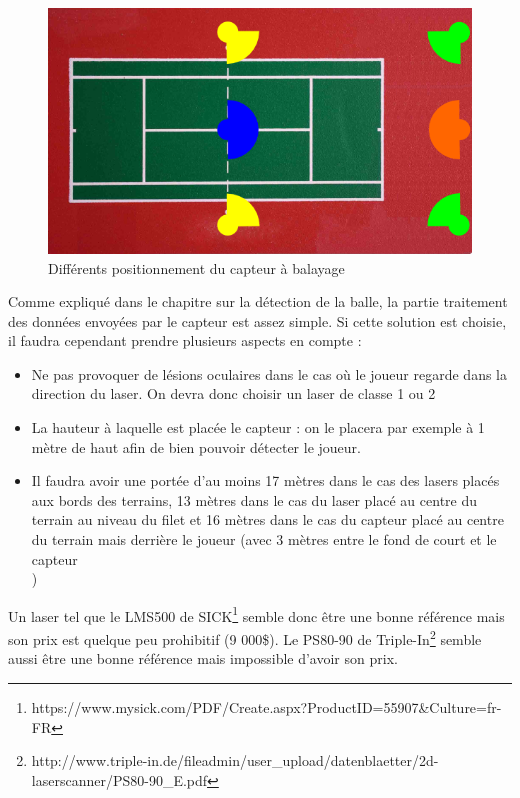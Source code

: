 \begin{figure}[h]
\begin{center}
\includegraphics[width=\textwidth]{joueurpositionlaser.png}
\caption{Différents positionnement du capteur à balayage}
\label{img_joueurpositionlaser}
\end{center}
\end{figure}

Comme expliqué dans le chapitre sur la détection de la balle, la partie traitement des données envoyées par le capteur est assez simple. Si cette solution est choisie, il faudra cependant prendre plusieurs aspects en compte : 

\begin{itemize}
\item Ne pas provoquer de lésions oculaires dans le cas où le joueur regarde dans la direction du laser. On devra donc choisir un laser de classe 1 ou 2
\item La hauteur à laquelle est placée le capteur : on le placera par exemple à 1 mètre de haut afin de bien pouvoir détecter le joueur. 
\item Il faudra avoir une portée d'au moins 17 mètres dans le cas des lasers placés aux bords des terrains, 13 mètres dans le cas du laser placé au centre du terrain au niveau du filet et 16 mètres dans le cas du capteur placé au centre du terrain mais derrière le joueur (avec 3 mètres entre le fond de court et le capteur\\)
\end{itemize}

Un laser tel que le LMS500 de SICK\footnote{https://www.mysick.com/PDF/Create.aspx?ProductID=55907\&Culture=fr-FR} semble donc être une bonne référence mais son prix est quelque peu prohibitif (9 000\$). Le PS80-90 de Triple-In\footnote{http://www.triple-in.de/fileadmin/user\_upload/datenblaetter/2d-laserscanner/PS80-90\_E.pdf} semble aussi être une bonne référence mais impossible d'avoir son prix. 


